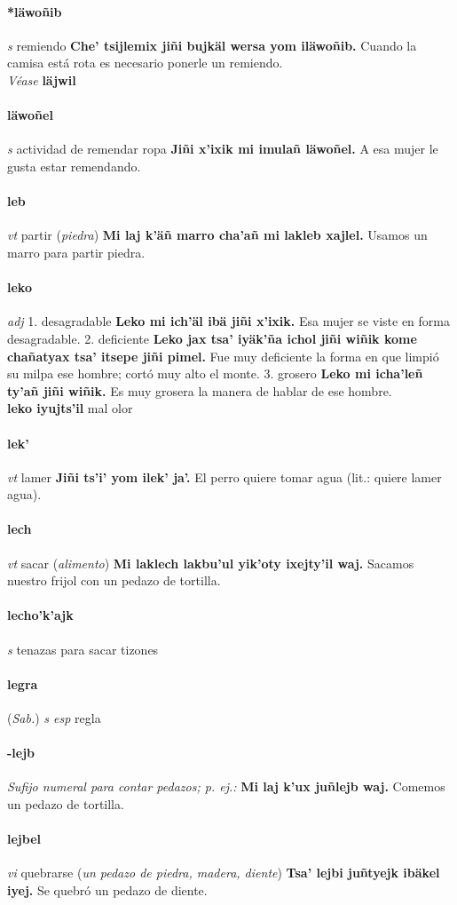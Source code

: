 \documentclass{scrbook}
\newcommand{\entry}[1]{\paragraph{#1}}
\newcommand{\onedefinition}[1]{#1.}
\newcommand{\nontranslationdef}[1]{\textit{#1}}
\newcommand{\partofspeech}[1]{\textit{#1}}
\newcommand{\spanishtranslation}[1]{#1}
\newcommand{\clarification}[1]{(\textit{#1})}
\newcommand{\cholexample}[1]{\textbf{#1}}
\newcommand{\exampletranslation}[1]{#1}
\newcommand{\alsosee}[1]{\\\textit{Véase} \textbf{#1}}
\newcommand{\relevantdialect}[1]{(\textit{#1})}
\newcommand{\secondaryentry}[1]{\\\textbf{#1}}
\newcommand{\secondtranslation}[1]{#1}
\begin{document}
\begin{multicols}{2}
\entry{*läwoñib}
\partofspeech{s}
\spanishtranslation{remiendo}
\cholexample{Che' tsijlemix jiñi bujkäl wersa yom iläwoñib.}
\exampletranslation{Cuando la camisa está rota es necesario ponerle un remiendo.}
\alsosee{läjwil}

\entry{läwoñel}
\partofspeech{s}
\spanishtranslation{actividad de remendar ropa}
\cholexample{Jiñi x'ixik mi imulañ läwoñel.}
\exampletranslation{A esa mujer le gusta estar remendando.}

\entry{leb}
\partofspeech{vt}
\spanishtranslation{partir}
\clarification{piedra}
\cholexample{Mi laj k'äñ marro cha'añ mi lakleb xajlel.}
\exampletranslation{Usamos un marro para partir piedra.}

\entry{leko}
\partofspeech{adj}
\onedefinition{1}
\spanishtranslation{desagradable}
\cholexample{Leko mi ich'äl ibä jiñi x'ixik.}
\exampletranslation{Esa mujer se viste en forma desagradable.}
\onedefinition{2}
\spanishtranslation{deficiente}
\cholexample{Leko jax tsa' iyäk'ña ichol jiñi wiñik kome chañatyax tsa' itsepe jiñi pimel.}
\exampletranslation{Fue muy deficiente la forma en que limpió su milpa ese hombre; cortó muy alto el monte.}
\onedefinition{3}
\spanishtranslation{grosero}
\cholexample{Leko mi icha'leñ ty'añ jiñi wiñik.}
\exampletranslation{Es muy grosera la manera de hablar de ese hombre.}
\secondaryentry{leko iyujts'il}
\secondtranslation{mal olor}

\entry{lek'}
\partofspeech{vt}
\spanishtranslation{lamer}
\cholexample{Jiñi ts'i' yom ilek' ja'.}
\exampletranslation{El perro quiere tomar agua (lit.: quiere lamer agua).}

\entry{lech}
\partofspeech{vt}
\spanishtranslation{sacar}
\clarification{alimento}
\cholexample{Mi laklech lakbu'ul yik'oty ixejty'il waj.}
\exampletranslation{Sacamos nuestro frijol con un pedazo de tortilla.}

\entry{lecho'k'ajk}
\partofspeech{s}
\spanishtranslation{tenazas para sacar tizones}

\entry{legra}
\relevantdialect{Sab.}
\partofspeech{s esp}
\spanishtranslation{regla}

\entry{-lejb}
\nontranslationdef{Sufijo numeral para contar pedazos; p. ej.:}
\cholexample{Mi laj k'ux juñlejb waj.}
\exampletranslation{Comemos un pedazo de tortilla.}

\entry{lejbel}
\partofspeech{vi}
\spanishtranslation{quebrarse}
\clarification{un pedazo de piedra, madera, diente}
\cholexample{Tsa' lejbi juñtyejk ibäkel iyej.}
\exampletranslation{Se quebró un pedazo de diente.}


\end{multicols}
\end{document}
